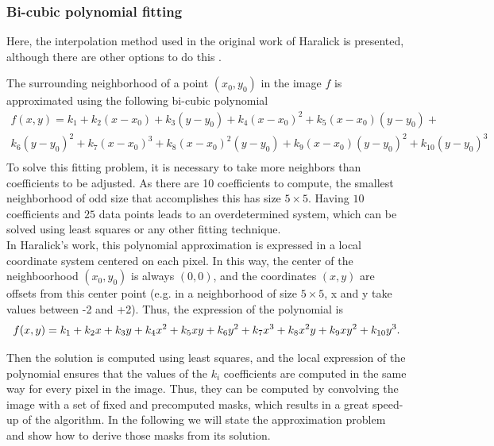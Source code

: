\documentclass{ipol}
\numberwithin{equation}{section}
\numberwithin{table}{section}
\begin{document}

\subsubsection{Bi-cubic polynomial fitting}
\label{sec:bicubic}

Here, the interpolation method used in the original work of Haralick is presented, although there are other options to do this \cite{getreuer}. 

The surrounding neighborhood of a point $(x_0,y_0)$ in the image $f$ is approximated using the following bi-cubic polynomial
\begin{align}
	\label{eq:bicubic:long}
	f(x,y) = k_1 + k_2 (x-x_0) + k_3(y-y_0) + k_4(x-x_0)^2 + k_5(x-x_0)(y-y_0)  +\\
	 k_6(y-y_0) ^2 + k_7(x-x_0)^3 + k_8(x-x_0)^2(y-y_0)  + k_9(x-x_0)(y-y_0) ^2 + k_{10}(y-y_0) ^3 \\
\end{align}
To solve this fitting problem, it is necessary to take more neighbors than coefficients to be adjusted. As there are 10 coefficients to compute, the smallest neighborhood of odd size that accomplishes this has size $5\times5$. Having $10$ coefficients and $25$ data 
points leads to an overdetermined system, which can be solved using least squares or any other fitting technique.\\

In Haralick's work, this polynomial approximation is expressed in a local coordinate system centered on each pixel. In this way, the center of the neighboorhood $(x_0,y_0)$ is always $(0,0)$, and the coordinates $(x, y)$ are offsets from this center point (e.g. in a neighborhood of size $5\times5$, x and y take values between -2 and +2). Thus, the expression of the polynomial is\\

\begin{equation}
	\label{eq:bicubic}
	f(x,y) = k_1 + k_2x + k_3y + k_4x^2 + k_5xy + k_6y^2 + k_7x^3 + k_8x^2y + k_9xy^2 + k_{10}y^3. \\
\end{equation}


Then the solution is computed using least squares, and the local expression of the polynomial ensures that the values of the $k_i$ coefficients are computed in the same way for every pixel in the image. Thus, they can be computed by convolving the image with a set of fixed and precomputed masks, which results in a great speed-up of the algorithm. In the following we will state the approximation problem and show how to derive those masks from its solution.\\
\end{document}
